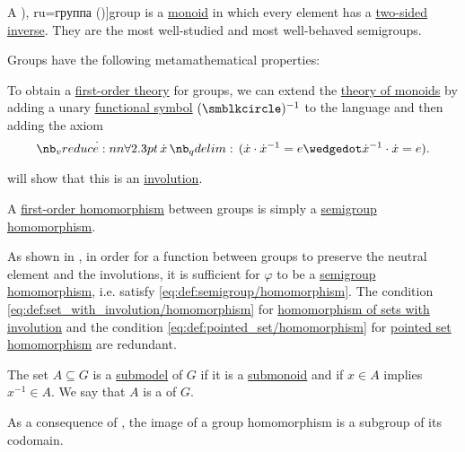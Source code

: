 \begin{definition}\label{def:group}
  A \term[bg=група (\cite[def. IV.2]{ГеновМиховскиМоллов1991}), ru=группа (\cite[def. 4.1.2]{Винберг2014})]{group} is a \hyperref[def:monoid]{monoid} in which every element has a \hyperref[def:monoid_inverse]{two-sided inverse}. They are the most well-studied and most well-behaved semigroups.

  Groups have the following metamathematical properties:
  \begin{thmenum}
     To obtain a \hyperref[def:first_order_theory]{first-order theory} for groups, we can extend the \hyperref[def:monoid/theory]{theory of monoids} by adding a unary \hyperref[def:first_order_language/fun]{functional symbol} \( (\anon)^{-1} \) to the language and then adding the axiom
    \begin{equation}\label{eq:def:group/theory/inverse_axiom}
      \qforall \synx (\synx \cdot \synx^{-1} = e \synwedge \synx^{-1} \cdot \synx = e).
    \end{equation}

     will show that this is an \hyperref[def:involution]{involution}.

     A \hyperref[def:first_order_homomorphism]{first-order homomorphism} between groups is simply a \hyperref[def:semigroup/homomorphism]{semigroup homomorphism}.

    As shown in , in order for a function between groups to preserve the neutral element and the involutions, it is sufficient for \( \varphi \) to be a \hyperref[def:semigroup/homomorphism]{semigroup homomorphism}, i.e. satisfy \eqref{eq:def:semigroup/homomorphism}. The condition \eqref{eq:def:set_with_involution/homomorphism} for \hyperref[def:set_with_involution/homomorphism]{homomorphism of sets with involution} and the condition \eqref{eq:def:pointed_set/homomorphism} for \hyperref[def:pointed_set/homomorphism]{pointed set homomorphism} are redundant.

     The set \( A \subseteq G \) is a \hyperref[def:first_order_submodel]{submodel} of \( G \) if it is a \hyperref[def:monoid/submodel]{submonoid} and if \( x \in A \) implies \( x^{-1} \in A \). We say that \( A \) is a  of \( G \).

    As a consequence of , the image of a group homomorphism is a subgroup of its codomain.


\end{thmenum}
\end{definition}
